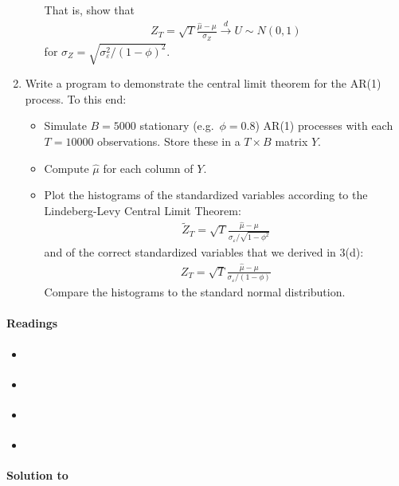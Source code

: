 \begin{enumerate}
\begin{enumerate}
	That is, show that
	\begin{align*}
	Z_{T} =\sqrt{T}\frac{\hat{\mu} -\mu }{\sigma_Z} \overset{d}{\rightarrow} U \sim N(0,1)
	\end{align*}
	for \(\sigma_Z=\sqrt{\sigma_\varepsilon^2/(1-\phi)^2}\).
\end{enumerate}
\item Write a program to demonstrate the central limit theorem for the AR(1) process. To this end:
\begin{itemize}
	\item Simulate \(B=5000\) stationary (e.g.\
	\(\phi=0.8\)) AR(1) processes with each \(T=10000\) observations.
	Store these in a \(T \times B\) matrix \(Y\).
	\item Compute \(\hat{\mu}\) for each column of \(Y\).
	\item Plot the histograms of the standardized variables according to the Lindeberg-Levy Central Limit Theorem:
	\begin{align*}
	\widetilde{Z}_T = \sqrt{T}\frac{\hat{\mu}-\mu}{\sigma_{\varepsilon }/\sqrt{1-\phi^2}}
	\end{align*}
	and of the correct standardized variables that we derived in 3(d):
	\begin{align*}
	Z_T = \sqrt{T}\frac{\hat{\mu}-\mu}{\sigma_{\varepsilon }/(1-\phi)}
	\end{align*}
	Compare the histograms to the standard normal distribution.
\end{itemize}
\end{enumerate}

\paragraph{Readings}
\begin{itemize}
	\item \textcite{Crack.Ledoit_2010_CentralLimitTheorems}
	\item \textcite[App. C]{Lutkepohl_2005_NewIntroductionMultiple}
	\item \textcite[App. C]{Neusser_2016_TimeSeriesEconometrics}
	\item \textcite[Ch. 5]{White_2001_AsymptoticTheoryEconometricians}
\end{itemize}

\begin{solution}\textbf{Solution to }
\ifDisplaySolutions

\fi
\newpage
\end{solution}